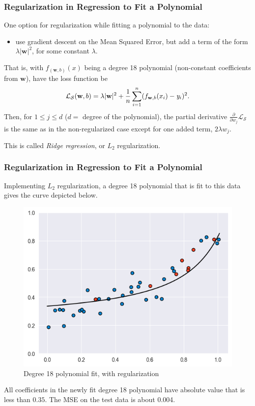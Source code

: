 \documentclass[smaller]{beamer}
\theoremstyle{example}
\newcommand{\ix}[1]{{\it #1}}
\begin{document}
\begin{frame}
    \frametitle{Regularization in Regression to Fit a Polynomial}
    One option for regularization while fitting a polynomial to the data: 
    \begin{itemize}
        \item use gradient descent on the Mean Squared Error, but add a term of the form $\lambda|\textbf{w}|^2$, for some constant $\lambda$. 
    \end{itemize}
    That is, with $f_{(\textbf{w}, b)}(x)$ being a degree 18 polynomial (non-constant coefficients from $\textbf{w}$), have the loss function be 
        \[\mathcal L_{\mathcal S}(\textbf{w}, b) = \lambda|\textbf{w}|^2 + \frac{1}n\sum_{i=1}^n (f_{\textbf{w}, b}(x_i) - \ix y_i)^2.\]
    Then, for $1\le j\le d$ ($d = $ degree of the polynomial), the partial derivative $\frac{\partial}{\partial w_j}\mathcal L_{\mathcal S}$ is the same as in the non-regularized case except for one added term, $2\lambda w_j$.

    This is called \textit{Ridge regression}, or $L_2$ regularization.  
\end{frame}

\begin{frame}
    \frametitle{Regularization in Regression to Fit a Polynomial}
    Implementing $L_2$ regularization, a degree 18 polynomial that is fit to this data gives the curve depicted below. 
    
    \begin{figure}
        \begin{center}
            \includegraphics[height=0.35\textheight]{../../Images/data_polynomial18_regfit.png}
        \end{center}
        \caption{Degree 18 polynomial fit, with regularization}
    \end{figure}
    All coefficients in the newly fit degree 18 polynomial have absolute value that is less than $0.35$. The MSE on the test data is about 0.004.
\end{frame}
\end{document}
